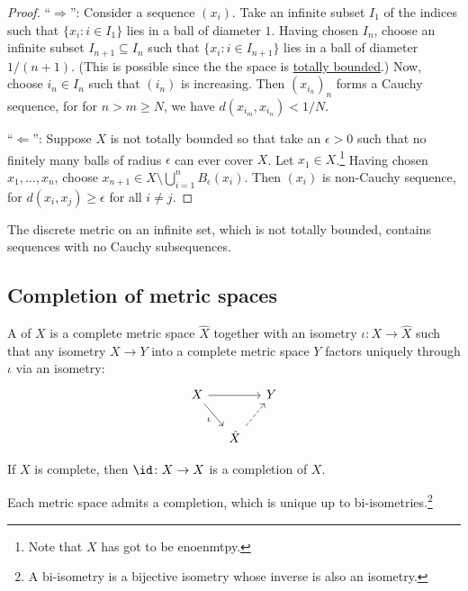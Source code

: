 \begin{proof}
	``$\Rightarrow$'': Consider a sequence $(x_i)$. Take an infinite subset $I_1$ of the indices such that $\{x_i : i\in I_1\}$ lies in a ball of diameter $1$. Having chosen $I_n$, choose
	an infinite subset $I_{n + 1}\subseteq I_n$ such that $\{x_i : i\in I_{n + 1}\}$ lies in a ball of diameter $1/(n + 1)$. (This is possible since the the space is \ul{totally bounded}.) Now, choose $i_n\in I_n$ such that $(i_n)$ is increasing. Then $(x_{i_n})_n$ forms a Cauchy sequence, for for $n > m\ge N$, we have $d(x_{i_m}, x_{i_n}) < 1/N$.
	
	``$\Leftarrow$'': Suppose $X$ is not totally bounded so that take an $\epsilon > 0$ such that no finitely many balls of radius $\epsilon$ can ever cover $X$. Let $x_1\in X$.\footnote{
		Note that $X$ has got to be enoenmtpy.}
	Having chosen $x_1, \ldots, x_n$, choose
	$x_{n + 1}\in X\setminus\bigcup_{i = 1}^n B_\epsilon(x_i)$. Then $(x_i)$ is non-Cauchy sequence, for $d(x_i, x_j)\ge \epsilon$ for all $i\ne j$.
\end{proof}

\begin{rmk}
	The discrete metric on an infinite set, which is not totally bounded, contains sequences with no Cauchy subsequences.
\end{rmk}



\subsection{Completion of metric spaces}

	A  of $X$ is a complete metric space $\hat X$ together with an isometry $\iota\colon X\to \hat X$ such that any isometry $X\to Y$ into a complete metric space $Y$ factors uniquely through $\iota$ via an isometry:
	\[
	\begin{tikzcd}[column sep=small]
		X\ar[rr]\ar[dr, "\iota"'] & & Y\\
		& \hat X\ar[ur, dashed] & 
	\end{tikzcd}
	\]
	
	\begin{cor}
		If $X$ is complete, then $\id\colon X\to X$ is a completion of $X$.
	\end{cor}
	
	\begin{prp}\label{PRP: completion of metric spaces}
		Each metric space admits a completion, which is unique up to bi-isometries.\footnote{
			A bi-isometry is a bijective isometry whose inverse is also an isometry.
		}
	\end{prp}
	
